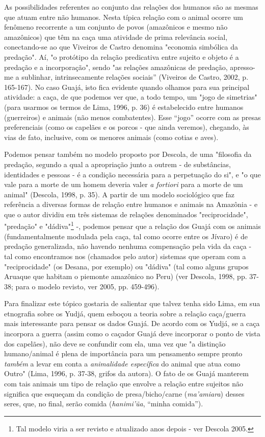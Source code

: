 As possibilidades referentes ao conjunto das relações dos humanos são as
mesmas que atuam entre não humanos. Nesta típica relação com o animal
ocorre um fenômeno recorrente a um conjunto de povos (amazônicos e mesmo
não amazônicos) que têm na caça uma atividade de prima relevância
social, conectando-se ao que Viveiros de Castro denomina "economia
simbólica da predação". Aí, "o protótipo da relação predicativa entre
sujeito e objeto é a predação e a incorporação", sendo "as relações
amazônicas de predação, apresso-me a sublinhar, intrinsecamente relações
sociais'' (Viveiros de Castro, 2002, p. 165-167). No caso Guajá, isto
fica evidente quando olhamos para sua principal atividade: a caça, de
que podemos ver que, a todo tempo, um "jogo de simetrias" (para usarmos
os termos de Lima, 1996, p. 36) é estabelecido entre humanos
(guerreiros) e animais (não menos combatentes). Esse ``jogo'' ocorre com
as presas preferenciais (como os capelães e os porcos - que ainda
veremos), chegando, às vias de fato, inclusive, com os menores animais
(como cotias e aves).

Podemos pensar também no modelo proposto por Descola, de uma "filosofia
da predação, segundo a qual a apropriação junto a outrem - de
substâncias, identidades e pessoas - é a condição necessária para a
perpetuação do si", e "o que vale para a morte de um homem deveria valer
\emph{a} \emph{fortiori} para a morte de um animal" (Descola, 1998, p.
35). A partir de um modelo sociológico que faz referência a diversas
formas de relação entre humanos e animais na Amazônia - e que o autor
dividiu em três sistemas de relações denominados "reciprocidade",
"predação" e "dádiva"\footnote{Tal modelo viria a ser revisto e
  atualizado anos depois - ver Descola 2005.} -, podemos pensar que a
relação dos Guajá com os animais (fundamentalmente modulada pela caça,
tal como ocorre entre os Jívaro) é de predação generalizada, não havendo
nenhuma compensação pela vida da caça - tal como encontramos nos
(chamados pelo autor) sistemas que operam com a "reciprocidade" (os
Desana, por exemplo) ou "dádiva" (tal como alguns grupos Aruaque que
habitam o piemonte amazônico no Peru) (ver Descola, 1998, pp. 37-38;
para o modelo revisto, ver 2005, pp. 459-496).

Para finalizar este tópico gostaria de salientar que talvez tenha sido
Lima, em sua etnografia sobre os Yudjá, quem esboçou a teoria sobre a
relação caça/guerra mais interessante para pensar os dados Guajá. De
acordo com os Yudjá, se a caça incorpora a guerra (assim como o caçador
Guajá deve incorporar o ponto de vista dos capelães), não deve se
confundir com ela, uma vez que "a distinção humano/animal é plena de
importância para um pensamento sempre pronto \emph{também} a levar em
conta a \emph{animalidade específica} do animal que atua como Outro"
(Lima, 1996, p. 37-38, grifos da autora). O fato de os Guajá manterem
com tais animais um tipo de relação que envolve a relação entre sujeitos
não significa que esqueçam da condição de presa/bicho/carne
(\emph{ma'amiara}) desses seres, que, no final, serão comida
(\emph{hanimi'ũa}, ``minha comida'').

